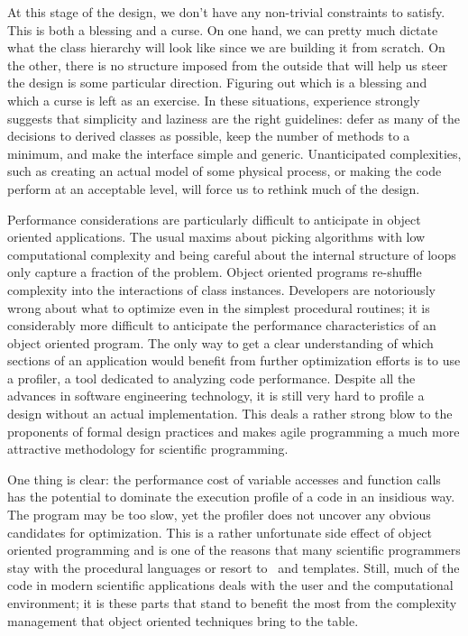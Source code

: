 At this stage of the design, we don't have any non-trivial constraints to satisfy. This is both
a blessing and a curse. On one hand, we can pretty much dictate what the class hierarchy will
look like since we are building it from scratch. On the other, there is no structure imposed
from the outside that will help us steer the design is some particular direction. Figuring out
which is a blessing and which a curse is left as an exercise. In these situations, experience
strongly suggests that simplicity and laziness are the right guidelines: defer as many of the
decisions to derived classes as possible, keep the number of methods to a minimum, and make the
interface simple and generic. Unanticipated complexities, such as creating an
actual model of some physical process, or making the code perform at an acceptable level, will
force us to rethink much of the design.

Performance considerations are particularly difficult to anticipate in object oriented
applications. The usual maxims about picking algorithms with low computational complexity and
being careful about the internal structure of loops only capture a fraction of the problem.
Object oriented programs re-shuffle complexity into the interactions of class instances.
Developers are notoriously wrong about what to optimize even in the simplest procedural
routines; it is considerably more difficult to anticipate the performance characteristics of an
object oriented program. The only way to get a clear understanding of which sections of an
application would benefit from further optimization efforts is to use a profiler, a tool
dedicated to analyzing code performance. Despite all the advances in software engineering
technology, it is still very hard to profile a design without an actual implementation. This
deals a rather strong blow to the proponents of formal design practices and makes agile
programming a much more attractive methodology for scientific programming.

One thing is clear: the performance cost of variable accesses and function calls has the
potential to dominate the execution profile of a code in an insidious way. The program may be
too slow, yet the profiler does not uncover any obvious candidates for optimization. This is a
rather unfortunate side effect of object oriented programming and is one of the reasons that
many scientific programmers stay with the procedural languages or resort to \cpp\ and
templates. Still, much of the code in modern scientific applications deals with the user and
the computational environment; it is these parts that stand to benefit the most from the
complexity management that object oriented techniques bring to the table.

